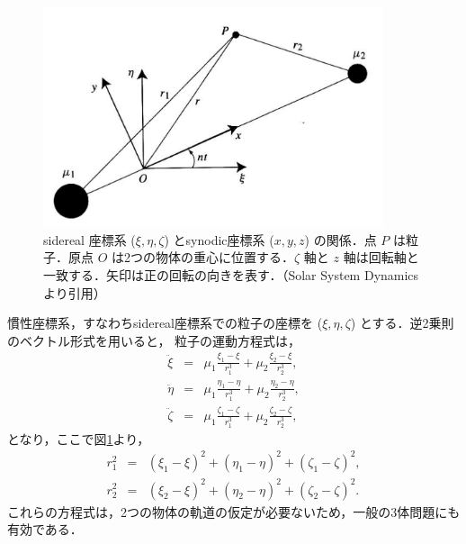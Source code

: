 \documentclass[11pt,a4paper,oneside,onecolumn]{jreport}
\begin{document}
\begin{figure}[H]
\centering
\includegraphics[width=10cm]{./image/sec3_1.pdf}
\caption{sidereal 座標系 ($\xi, \eta, \zeta$) とsynodic座標系 ($x, y, z$) の関係．点 $P$ は粒子．原点 $O$ は2つの物体の重心に位置する．$\zeta$ 軸と $z$ 軸は回転軸と一致する．矢印は正の回転の向きを表す．（Solar System Dynamics\cite{SSD} より引用）\label{fig:xi_eta_zeta}}
\end{figure}

慣性座標系，すなわちsidereal座標系での粒子の座標を ($\xi, \eta, \zeta$) とする．逆2乗則のベクトル形式を用いると，
粒子の運動方程式は，
\begin{eqnarray}
\ddot{\xi} & = & \mu_1 \frac{\xi_1 - \xi}{r_1^3} + \mu_2 \frac{\xi_2 - \xi}{r_2^3}, \label{eq:xiddot}\\
\ddot{\eta} & = & \mu_1 \frac{\eta_1 - \eta}{r_1^3} + \mu_2 \frac{\eta_2 - \eta}{r_2^3}, \label{eq:etaddot}\\
\ddot{\zeta} & = & \mu_1 \frac{\zeta_1 - \zeta}{r_1^3} + \mu_2 \frac{\zeta_2 - \zeta}{r_2^3}, \label{eq:zetaddot}
\end{eqnarray}
となり，ここで図\ref{fig:xi_eta_zeta}より，
\begin{eqnarray}
r_1^2 & = & (\xi_1 - \xi)^2 + (\eta_1 - \eta)^2 + (\zeta_1 - \zeta)^2,\\
r_2^2 & = & (\xi_2 - \xi)^2 + (\eta_2 - \eta)^2 + (\zeta_2 - \zeta)^2.
\end{eqnarray}
これらの方程式は，2つの物体の軌道の仮定が必要ないため，一般の3体問題にも有効である．
\end{document}
